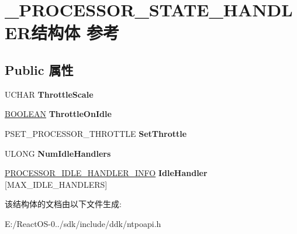 \hypertarget{struct___p_r_o_c_e_s_s_o_r___s_t_a_t_e___h_a_n_d_l_e_r}{}\section{\+\_\+\+P\+R\+O\+C\+E\+S\+S\+O\+R\+\_\+\+S\+T\+A\+T\+E\+\_\+\+H\+A\+N\+D\+L\+E\+R结构体 参考}
\label{struct___p_r_o_c_e_s_s_o_r___s_t_a_t_e___h_a_n_d_l_e_r}
\subsection*{Public 属性}
\begin{DoxyCompactItemize}
\item 
\mbox{\label{struct___p_r_o_c_e_s_s_o_r___s_t_a_t_e___h_a_n_d_l_e_r_a273cb134598aa02fa7a30fc98a42971c}} 
U\+C\+H\+AR {\bfseries Throttle\+Scale}
\item 
\mbox{\label{struct___p_r_o_c_e_s_s_o_r___s_t_a_t_e___h_a_n_d_l_e_r_a581330a341c256d66df21aba6babc449}} 
\hyperlink{_processor_bind_8h_a112e3146cb38b6ee95e64d85842e380a}{B\+O\+O\+L\+E\+AN} {\bfseries Throttle\+On\+Idle}
\item 
\mbox{\label{struct___p_r_o_c_e_s_s_o_r___s_t_a_t_e___h_a_n_d_l_e_r_a33ce05a83e630e024f536deba95d4691}} 
P\+S\+E\+T\+\_\+\+P\+R\+O\+C\+E\+S\+S\+O\+R\+\_\+\+T\+H\+R\+O\+T\+T\+LE {\bfseries Set\+Throttle}
\item 
\mbox{\label{struct___p_r_o_c_e_s_s_o_r___s_t_a_t_e___h_a_n_d_l_e_r_aa30892374490390fa9fac32fea590c84}} 
U\+L\+O\+NG {\bfseries Num\+Idle\+Handlers}
\item 
\mbox{\label{struct___p_r_o_c_e_s_s_o_r___s_t_a_t_e___h_a_n_d_l_e_r_a6946443850e6539ff6926b7f9c88cc15}} 
\hyperlink{struct___p_r_o_c_e_s_s_o_r___i_d_l_e___h_a_n_d_l_e_r___i_n_f_o}{P\+R\+O\+C\+E\+S\+S\+O\+R\+\_\+\+I\+D\+L\+E\+\_\+\+H\+A\+N\+D\+L\+E\+R\+\_\+\+I\+N\+FO} {\bfseries Idle\+Handler} \mbox{[}M\+A\+X\+\_\+\+I\+D\+L\+E\+\_\+\+H\+A\+N\+D\+L\+E\+RS\mbox{]}
\end{DoxyCompactItemize}


该结构体的文档由以下文件生成\+:\begin{DoxyCompactItemize}
\item 
E\+:/\+React\+O\+S-\/0../sdk/include/ddk/ntpoapi.\+h\end{DoxyCompactItemize}
